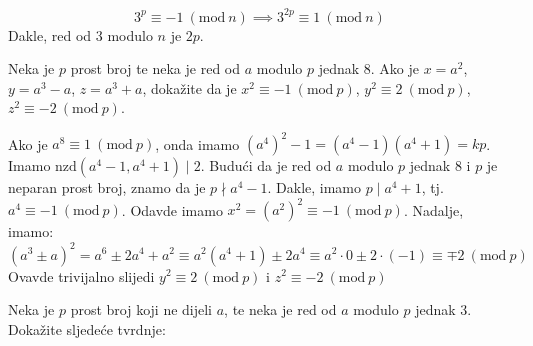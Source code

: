\documentclass{exam}
\newcommand{\Mod}[1]{\ (\mathrm{mod}\ #1)}
\begin{document}
\begin{questions}
\begin{solution}
  \[
    3^{p} \equiv -1 \Mod{n} \implies 3^{2p} \equiv 1 \Mod{n}
  \]
  Dakle, red od 3 modulo $n$ je $2p$.
\end{solution}

\question Neka je $p$ prost broj te neka je red od $a$ modulo $p$ jednak 8. Ako je $x = a^2$, $y = a^3 - a$, $z = a^3 + a$, dokažite da je $x^2 \equiv -1 \Mod{p}$, $y^2 \equiv 2 \Mod{p}$, $z^2 \equiv -2 \Mod{p}$.

\begin{solution}
  Ako je $a^8 \equiv 1 \Mod{p}$, onda imamo $(a^4)^2 - 1 = (a^4 - 1) (a^4 + 1) = k p$. Imamo $\text{nzd}(a^4 - 1, a^4 + 1) \mid 2$. Budući da je red od $a$ modulo $p$ jednak 8 i $p$ je neparan prost broj, znamo da je $p \nmid a^4 - 1$. Dakle, imamo $p \mid a^4 + 1$, tj. $a^4 \equiv -1 \Mod{p}$. Odavde imamo $x^2 = (a^2)^2 \equiv -1 \Mod{p}$. Nadalje, imamo:
  \[
    (a^3 \pm a)^2 = a^6 \pm 2a^4 + a^2 \equiv a^2 (a^4 + 1) \pm 2a^4 \equiv a^2 \cdot 0 \pm 2 \cdot (-1) \equiv \mp 2 \Mod{p}
  \]
  Ovavde trivijalno slijedi $y^2 \equiv 2 \Mod{p}$ i $z^2 \equiv -2 \Mod{p}$
\end{solution}

\question Neka je $p$ prost broj koji ne dijeli $a$, te neka je red od $a$ modulo $p$ jednak 3. Dokažite sljedeće tvrdnje:

\begin{solution}
\end{solution}
\end{questions}
\end{document}
